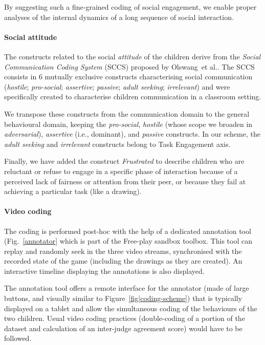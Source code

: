 \documentclass[sigconf]{acmart}
\newcommand{\etal}{et al.\xspace}
\newcommand{\ie}{i.e.,\xspace}
\begin{document}
By suggesting such a fine-grained coding of social engagement, we enable proper
analyses of the internal dynamics of a long sequence of social interaction.

\paragraph{Social attitude}

The constructs related to the social \emph{attitude} of the children derive from the
\emph{Social Communication Coding System} (SCCS) proposed by
Olswang~\etal\cite{olswang2006reliability}.  The SCCS consists in 6 mutually
exclusive constructs characterising social communication (\emph{hostile};
\emph{pro-social}; \emph{assertive}; \emph{passive}; \emph{adult seeking};
\emph{irrelevant}) and were specifically created to characterise children
communication in a classroom setting.

We transpose these constructs from the communication domain to the general
behavioural domain, keeping the \emph{pro-social}, \emph{hostile} (whose scope
we broaden in \emph{adversarial}), \emph{assertive} (\ie dominant), and
\emph{passive} constructs. In our scheme, the \emph{adult seeking} and
\emph{irrelevant} constructs belong to Task Engagement axis.

Finally, we have added the construct \emph{Frustrated} to describe children who
are reluctant or refuse to engage in a specific phase of interaction
because of a perceived lack of fairness or attention from their peer, or because
they fail at achieving a particular task (like a drawing).

\paragraph{Video coding}

The coding is performed post-hoc with the help of a dedicated annotation tool
(Fig.~\ref{annotator} which is part of the Free-play sandbox toolbox. This tool
can replay and randomly seek in the three video streams, synchronised with the
recorded state of the game (including the drawings as they are created). An
interactive timeline displaying the annotations is also displayed.

The annotation tool offers a remote interface for the annotator (made of large
buttons, and visually similar to Figure~\ref{fig|coding-scheme}) that is
typically displayed on a tablet and allow the simultaneous coding of the
behaviours of the two children.  Usual video coding practices (double-coding of
a portion of the dataset and calculation of an inter-judge agreement score)
would have to be followed.
\end{document}
